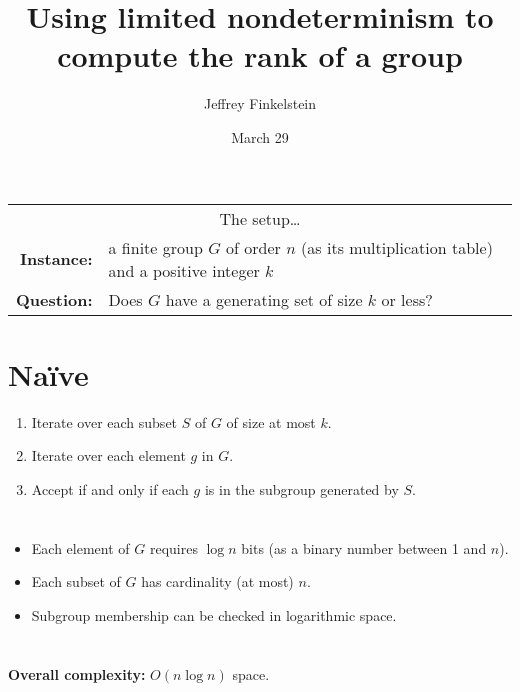 \documentclass{lposter-with-tkz-graph} %
\title{Using limited nondeterminism to compute the rank of a group}
\author{Jef{}frey Finkelstein}
\date{March 29}
\newenvironment{poster}{%
\thispagestyle{fancy}
\begin{multicols*}{3}
}%
{\end{multicols*}
}
\begin{document}
\begin{center}
  \begin{table}
    {\Large
    \begin{tabular}{r l}
      \multicolumn{2}{c}{\LARGE The setup\ldots} \\[0.5em]
      \textbf{Instance:} & a finite group $G$ of order $n$ (as its multiplication table) and a positive integer $k$ \\
      \textbf{Question:} & Does $G$ have a generating set of size $k$ or less?
    \end{tabular}
    }
  \end{table}
\end{center}

\begin{poster}


\section{Na\"{i}ve}

\begin{enumerate}
\item Iterate over each subset $S$ of $G$ of size at most $k$.
\item Iterate over each element $g$ in $G$.
\item Accept if and only if each $g$ is in the subgroup generated by $S$.
\end{enumerate}

\section{}

\begin{itemize}
\itemsep1em
\item[] Each element of $G$ requires $\log n$ bits (as a binary number between 1 and $n$).
\item[] Each subset of $G$ has cardinality (at most) $n$.
\item[] Subgroup membership can be checked in logarithmic space.
\end{itemize}

\section{}

\begin{center}
\textbf{Overall complexity:} $O(n \log n)$ space.
\end{center}


\end{poster}
\end{document}
